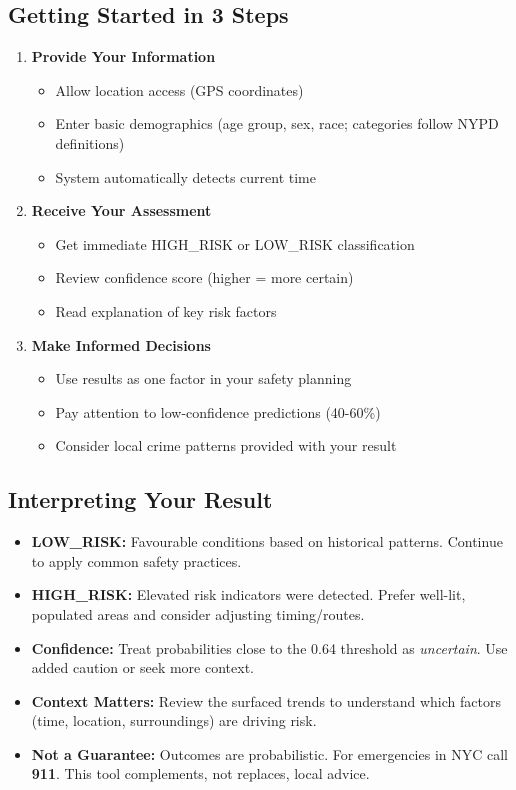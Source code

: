\documentclass[11pt]{article}
\begin{document}
\subsection{Getting Started in 3 Steps}
\begin{enumerate}
\item \textbf{Provide Your Information}
  \begin{itemize}
  \item Allow location access (GPS coordinates)
  \item Enter basic demographics (age group, sex, race; categories follow NYPD definitions)
  \item System automatically detects current time
  \end{itemize}

\item \textbf{Receive Your Assessment}
  \begin{itemize}
  \item Get immediate HIGH\_RISK or LOW\_RISK classification
  \item Review confidence score (higher = more certain)
  \item Read explanation of key risk factors
  \end{itemize}

\item \textbf{Make Informed Decisions}
  \begin{itemize}
  \item Use results as one factor in your safety planning
  \item Pay attention to low-confidence predictions (40-60\%)
  \item Consider local crime patterns provided with your result
  \end{itemize}
\end{enumerate}

\subsection{Interpreting Your Result}
\begin{itemize}[leftmargin=*]
\item \textbf{LOW\_RISK:} Favourable conditions based on historical patterns. Continue to apply common safety practices.
\item \textbf{HIGH\_RISK:} Elevated risk indicators were detected. Prefer well-lit, populated areas and consider adjusting timing/routes.
\item \textbf{Confidence:} Treat probabilities close to the 0.64 threshold as \textit{uncertain}. Use added caution or seek more context.
\item \textbf{Context Matters:} Review the surfaced trends to understand which factors (time, location, surroundings) are driving risk.
\item \textbf{Not a Guarantee:} Outcomes are probabilistic. For emergencies in NYC call \textbf{911}. This tool complements, not replaces, local advice.
\end{itemize}
\end{document}
